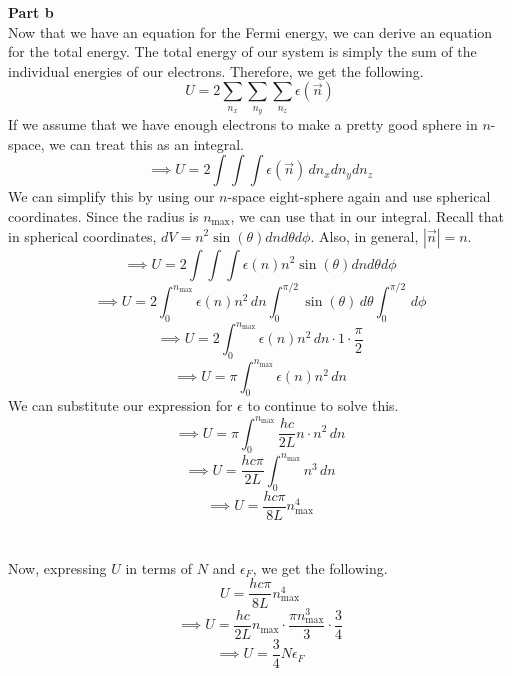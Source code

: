 \documentclass[12pt]{article}
\begin{document}
\begin{flushleft}
\textbf{Part b}\\
Now that we have an equation for the Fermi energy, we can derive an equation for the total energy.
The total energy of our system is simply the sum of the individual energies of our electrons.
Therefore, we get the following.
$$U=2\sum_{n_x}\sum_{n_y}\sum_{n_z}\epsilon(\vec{n})$$
If we assume that we have enough electrons to make a pretty good sphere in $n$-space, we can treat this as an integral.
$$\implies U=2\int\int\int\epsilon(\vec{n})\,dn_xdn_ydn_z$$
We can simplify this by using our $n$-space eight-sphere again and use spherical coordinates.
Since the radius is $n_\text{max}$, we can use that in our integral.
Recall that in spherical coordinates, $dV=n^2\sin(\theta)dnd\theta d\phi$.
Also, in general, $|\vec{n}|=n$.
$$\implies U=2\int\int\int\epsilon(n)n^2\sin(\theta)dnd\theta d\phi$$
$$\implies U=2\int_0^{n_\text{max}}\epsilon(n)n^2\,dn\int_0^{\pi/2}\sin(\theta)\,d\theta \int_0^{\pi/2}\,d\phi$$
$$\implies U=2\int_0^{n_\text{max}}\epsilon(n)n^2\,dn\cdot1\cdot\frac{\pi}{2}$$
$$\implies U=\pi\int_0^{n_\text{max}}\epsilon(n)n^2\,dn$$
We can substitute our expression for $\epsilon$ to continue to solve this.
$$\implies U=\pi\int_0^{n_\text{max}}\frac{hc}{2L}n\cdot n^2\,dn$$
$$\implies U=\frac{hc\pi}{2L}\int_0^{n_\text{max}}n^3\,dn$$
$$\implies U=\frac{hc\pi}{8L}n_\text{max}^4$$\\~\\

Now, expressing $U$ in terms of $N$ and $\epsilon_F$, we get the following.
$$U=\frac{hc\pi}{8L}n_\text{max}^4$$
$$\implies U=\frac{hc}{2L}n_\text{max}\cdot\frac{\pi n_\text{max}^3}{3}\cdot\frac{3}{4}$$
$$\implies U=\frac{3}{4}N\epsilon_F$$



\end{flushleft}
\end{document}
